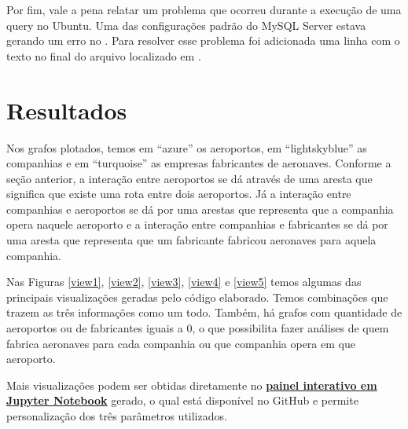 \documentclass{article}
\begin{document}
Por fim, vale a pena relatar um problema que ocorreu durante a execução de uma query no Ubuntu. Uma das configurações padrão do MySQL Server estava gerando um erro no . Para resolver esse problema foi adicionada uma linha com o texto  no final do arquivo localizado em .

\section{Resultados}

Nos grafos plotados, temos em ``azure'' os aeroportos, em ``lightskyblue'' as companhias e em ``turquoise'' as empresas fabricantes de aeronaves. Conforme a seção anterior, a interação entre aeroportos se dá através de uma aresta que significa que existe uma rota entre dois aeroportos. Já a interação entre companhias e aeroportos se dá por uma arestas que representa que a companhia opera naquele aeroporto e a interação entre companhias e fabricantes se dá por uma aresta que representa que um fabricante fabricou aeronaves para aquela companhia.

Nas Figuras \ref{view1}, \ref{view2}, \ref{view3}, \ref{view4} e \ref{view5} temos algumas das principais visualizações geradas pelo código elaborado. Temos combinações que trazem as três informações como um todo. Também, há grafos com quantidade de aeroportos ou de fabricantes iguais a 0, o que possibilita fazer análises de quem fabrica aeronaves para cada companhia ou que companhia opera em que aeroporto.

Mais visualizações podem ser obtidas diretamente no \href{https://github.com/IgorMichels/USA_Flights_Graphs/blob/main/Grafo\%20-\%20Final.ipynb}{\textbf{painel interativo em Jupyter Notebook}} gerado, o qual está disponível no GitHub \cite{github2} e permite personalização dos três parâmetros utilizados.
\end{document}
